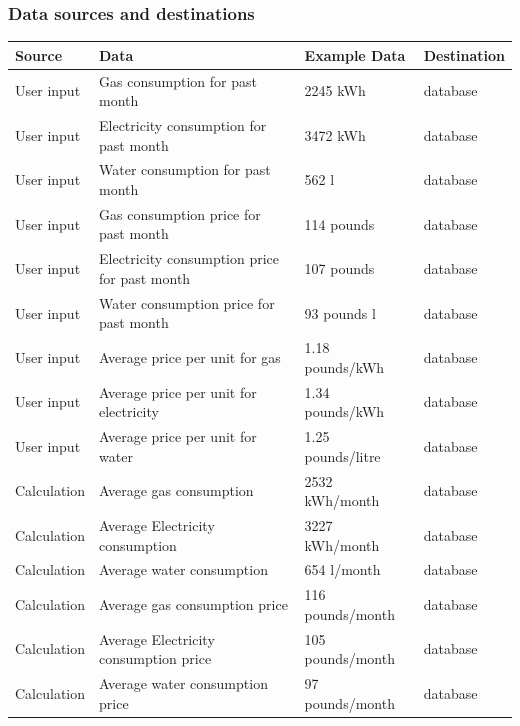 \subsubsection{Data sources and destinations}
\begin{center}
\begin{tabular}{|l|l|l|l|}
	\hline
	\textbf{Source} & \textbf{Data} & \textbf{Example Data} & \textbf{Destination} \\ \hline
	User input & Gas consumption for past month & 2245 kWh & database \\ \hline
 	User input & Electricity consumption for past month & 3472 kWh & database \\ \hline
	User input & Water consumption for past month & 562 l & database \\ \hline
	User input & Gas consumption price for past month & 114 pounds & database \\ \hline
 	User input & Electricity consumption price for past month & 107 pounds & database \\ \hline
	User input & Water consumption price for past month & 93 pounds l & database \\ \hline
	User input & Average price per unit for gas & 1.18 pounds/kWh & database \\ \hline
 	User input & Average price per unit for electricity & 1.34 pounds/kWh & database \\ \hline
	User input & Average price per unit for water & 1.25 pounds/litre & database \\ \hline
	Calculation & Average gas consumption & 2532 kWh/month & database \\ \hline
	Calculation & Average Electricity consumption & 3227 kWh/month& database \\ \hline
	Calculation & Average water consumption & 654 l/month & database \\ \hline
	Calculation & Average gas consumption price & 116 pounds/month & database \\ \hline
	Calculation & Average Electricity consumption price & 105 pounds/month & database \\ \hline
	Calculation & Average water consumption price & 97 pounds/month & database \\ \hline
	
\end{tabular}
\label{tab:Data sources and destinations for the proposed system}
\end{center}

